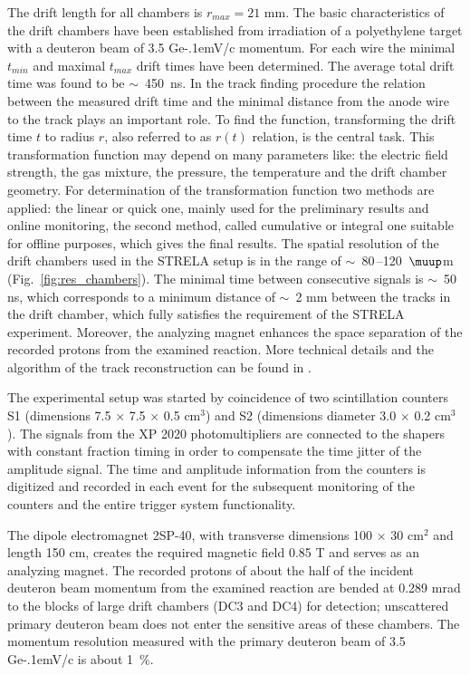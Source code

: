 \documentclass[twocolumn,epjc3]{svjour3}
\newcommand{\GeVc}   {Ge\kern-.1emV/c\xspace}
\begin{document}
The drift length for all chambers is $r_{max} = 21$ mm. The basic
characteristics of the drift chambers have been established from irradiation of
a polyethylene target with a deuteron beam of 3.5 \GeVc momentum. For each wire
the minimal $t_{min}$ and maximal $t_{max}$ drift times have been
determined. The average total drift time was found to be $\sim$~450~ns. In the
track finding procedure the relation between the measured drift time and the
minimal distance from the anode wire to the track plays an important role. To
find the function, transforming the drift time $t$ to radius $r$, also referred
to as $r(t)$ relation, is the central task. This transformation function may
depend on many parameters like: the electric field strength, the gas mixture,
the pressure, the temperature and the drift chamber geometry. For determination
of the transformation function two methods are applied: the linear or quick one,
mainly used for the preliminary results and online monitoring, the second
method, called cumulative or integral one suitable for offline purposes, which
gives the final results. The spatial resolution of the drift chambers used in
the STRELA setup is in the range of $\sim$~80\,--120~$\muup$m
(Fig.~\ref{fig:res_chambers}). The minimal time between consecutive signals is
$\sim$~50 ns, which corresponds to a minimum distance of $\sim$~2 mm between the
tracks in the drift chamber, which fully satisfies the requirement of the STRELA
experiment. Moreover, the analyzing magnet enhances the space separation of the
recorded protons from the examined reaction. More technical details and the
algorithm of the track reconstruction can be found in \cite{gla13}.

The experimental setup was started by coincidence of two scintillation counters
S1 (dimensions 7.5 $\times$ 7.5 $\times$ 0.5 cm$^3$) and S2 (dimensions diameter
3.0 $\times$ 0.2 cm$^3$). The signals from the XP 2020 photomultipliers are
connected to the shapers with constant fraction timing in order to compensate
the time jitter of the amplitude signal. The time and amplitude information from
the counters is digitized and recorded in each event for the subsequent
monitoring of the counters and the entire trigger system functionality.

The dipole electromagnet 2SP-40, with transverse dimensions 100 $\times$ 30
cm$^2$ and length 150 cm, creates the required magnetic field 0.85 T and serves
as an analyzing magnet. The recorded protons of about the half of the incident
deuteron beam momentum from the examined reaction are bended at 0.289 mrad to
the blocks of large drift chambers (DC3 and DC4) for detection; unscattered
primary deuteron beam does not enter the sensitive areas of these chambers. The
momentum resolution measured with the primary deuteron beam of 3.5 \GeVc is
about 1~\%.
\end{document}

